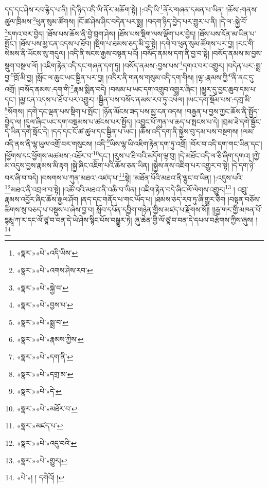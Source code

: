 དད་དང་ཤེས་རབ་རྙེད་པ་ནི། །དེ་ཉིད་འདི་ཡི་ནོར་མཆོག་སྟེ། །:འདི་ཡི་\footnote{«སྣར་»«པེ་»འདི་ཡིས་}ནོར་གཞན་དམན་པ་ཡིན། །ཆོས་:གནས་ཚུལ་ཁྲིམས་\footnote{«སྣར་»«པེ་»འགས་ཤེས་རབ་}ཕུན་སུམ་ཚོགས། །ངོ་ཚ་ཤེས་ཤིང་བདེན་པར་སྨྲ། །བདག་ཉིད་བྱེད་པར་གྱུར་པ་ནི། །དེ་ལ་:སྐྱེ་བོ་\footnote{«སྣར་»«པེ་»སྐྱེ་བ་}དགའ་བར་བྱེད། །ཐོས་པས་ཆོས་ནི་བྱེ་བྲག་ཤེས། །ཐོས་པས་སྡིག་ལས་ལྡོག་པར་བྱེད། །ཐོས་པས་དོན་མ་ཡིན་པ་སྤོང་། །ཐོས་པས་མྱ་ངན་འདས་པ་ཐོབ། །སྡིག་པ་ཐམས་ཅད་མི་བྱ་སྟེ། །དགེ་བ་ཕུན་སུམ་ཚོགས་པར་བྱ། །རང་གི་སེམས་ནི་ཡོངས་སུ་གདུལ། །འདི་ནི་སངས་རྒྱས་བསྟན་པའོ། །བསོད་ནམས་དག་ནི་བྱ་བ་སྟེ། །བསོད་ནམས་མ་བྱས་སྡུག་བསྔལ་ལོ། །འཇིག་རྟེན་འདི་དང་གཞན་དག་ཏུ། །བསོད་ནམས་:བྱས་པས་\footnote{«སྣར་»«པེ་»བྱས་པ་}དགའ་བར་འགྱུར། །བདེན་པར་:སྨྲ་བྱ་\footnote{«སྣར་»«པེ་»སྨྲ་བ་}ཁྲོ་མི་བྱ། །སློང་ལ་ཆུང་ཡང་སྦྱིན་པར་བྱ། །འདིར་ནི་གནས་གསུམ་འདི་དག་གིས། །ལྷ་:རྣམས་ཀྱི་\footnote{«སྣར་»«པེ་»རྣམས་ཀྱིས་}ནི་ནང་དུ་འགྲོ། །བསོད་ནམས་:དག་གི་\footnote{«སྣར་»«པེ་»དག་ནི་}རྣམ་སྨིན་བདེ། །བསམ་པ་ཡང་དག་འགྲུབ་འགྱུར་ཞིང་། །མྱུར་དུ་བྱང་ཆུབ་དམ་པ་དང་། །མྱ་ངན་འདས་པ་ཐོབ་པར་འགྱུར། །སྦྱིན་པས་བསོད་ནམས་རབ་ཏུ་འཕེལ། །ཡང་དག་སྡོམ་པས་:དགྲ་མི་\footnote{«སྣར་»«པེ་»དགྲ་མ་}སོགས། །དགེ་དང་ལྡན་པས་སྡིག་པ་སྤོང་། །ཉོན་མོངས་ཟད་པས་མྱ་ངན་འདས། །བརྒྱན་པ་བྱས་ཀྱང་ཆོས་ནི་སྤྱོད་བྱེད་ལ། །དུལ་ཞིང་ཡང་དག་བསྡམས་པ་ཚངས་པར་སྤྱོད། །འབྱུང་པོ་ཀུན་ལ་ཆད་པ་སྤངས་པ་དེ། །བྲམ་ཟེ་དགེ་སྦྱོང་དེ་ཡིན་དགེ་སློང་དེ། །དད་དང་ངོ་ཚ་ཚུལ་དང་སྦྱིན་པ་ཡང་། །ཆོས་འདི་དག་ནི་སྐྱེས་བུ་དམ་པས་བསྔགས། །ལམ་འདི་ནས་ནི་ལྷ་ཡུལ་འགྲོ་བར་གསུངས། །འདི་\footnote{«སྣར་»«པེ་»དེ་}ཡིས་ལྷ་ཡི་འཇིག་རྟེན་དག་ཏུ་འགྲོ། །བོར་བ་འདི་དག་གང་ཡིན་དང་། །ཕྱོགས་དང་ཕྱོགས་མཚམས་:འཐོར་བ་\footnote{«སྣར་»«པེ་»མཐོར་བ་}དང་། །རུས་པ་ཐི་བའི་མདོག་ལྟ་བུ། །དེ་མཐོང་འདི་ལ་ཅི་ཞིག་དགའ། །ཀྱེ་མ་འདུས་བྱས་རྣམས་མི་རྟག །སྐྱེ་ཞིང་འཇིག་པའི་ཆོས་ཅན་ཡིན། །སྐྱེས་ནས་འཇིག་པར་འགྱུར་བ་སྟེ། །དེ་དག་ཉེ་བར་ཞི་བ་བདེ། །བསགས་པ་ཀུན་མཐའ་:འཛད་པ་\footnote{«སྣར་»མཛད་པ་}སྟེ། །མཐོན་པོའི་མཐའ་ནི་ལྷུང་བ་ཡིན། །:འདུས་པའི་\footnote{«སྣར་»«པེ་»འདུ་བའི་}མཐའ་ནི་འབྲལ་བ་སྟེ། །འཚོ་བའི་མཐའ་ནི་འཆི་བ་ཡིན། །འཇིག་རྟེན་བདེ་ཞིང་ལོ་ལེགས་འགྱུར།\footnote{«སྣར་»«པེ་»གྱུར།} །
འབྲུ་རྣམས་འབྱོར་ཞིང་ཆོས་རྒྱལ་ཤོག །ནད་དང་གནོད་པ་གང་ཡོད་པ། །ཐམས་ཅད་རབ་ཏུ་ཞི་གྱུར་ཅིག །བསྟན་བཅོས་ཚིགས་སུ་བཅད་པ་བསྡུས་པ་ཞེས་བྱ་བ། སློབ་དཔོན་དབྱིག་གཉེན་གྱིས་མཛད་པ་རྫོགས་སོ།། །།རྒྱ་གར་གྱི་མཁན་པོ་དྷརྨཱ་ཀ་ར་དང་ལོ་ཙཱ་བ་བན་དེ་ཡེ་ཤེས་སྙིང་པོས་བསྒྱུར་ཏེ། ཞུ་ཆེན་གྱི་ལོ་ཙཱ་བ་བན་དེ་དཔལ་བརྩེགས་ཀྱིས་ཞུས། ། \footnote{«པེ་»། ། དགེའོ། །}